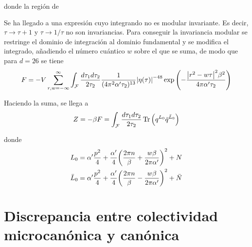 donde la región de 

Se ha llegado a una expresión cuyo integrando no es modular invariante. Es decir, 
$\tau\to\tau+1$ y $\tau\to1/\tau$ no son invariancias.
Para conseguir la invariancia modular se restringe el dominio de integración al dominio
fundamental y se modifica el integrado, añadiendo el número cuántico $w$ sobre el que 
se suma, de modo que para $d=26$ se tiene
\begin{equation}
  F=-V \sum_{r,w=-\infty}^{\infty} \int_\mathcal{F}  \frac{d\tau_1d\tau_2}{2\tau_2}   \frac{1}{(4\pi^2\alpha'\tau_2)^{13}}
  \abs{\eta(\tau)}^{-48}\exp\qty(-\frac{\abs{r^2-w\tau}^2\beta^2}{4\pi\alpha'\tau_2})
\end{equation}

Haciendo la suma, se llega a
\begin{equation}
  Z=-\beta F=\int_{\mathcal F}\frac{d\tau_1d\tau_2}{2\tau_2}\Tr\qty(q^{L_0}\bar q^{\bar L_0})
\end{equation}

donde
\begin{align}
  L_0&=\alpha'\frac{p^2}{4}+\frac{\alpha'}{4}\qty(\frac{2\pi n}{\beta}+\frac{w\beta}{2\pi\alpha'})^2+N\\ 
 \bar L_0&=\alpha'\frac{p^2}{4}+\frac{\alpha'}{4}\qty(\frac{2\pi n}{\beta}-\frac{w\beta}{2\pi\alpha'})^2+\bar N
\end{align}


%

\section{Discrepancia entre colectividad microcanónica y canónica}

